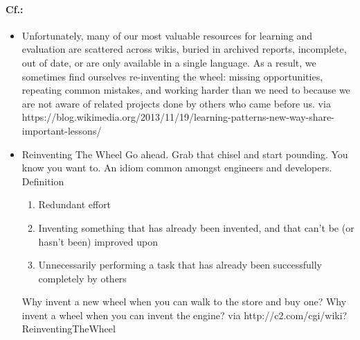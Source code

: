 \paragraph{Cf.:} 
\begin{itemize}
\item Unfortunately, many of our most valuable resources for learning and evaluation are scattered across wikis, buried in archived reports, incomplete, out of date, or are only available in a single language. As a result, we sometimes find ourselves re-inventing the wheel: missing opportunities, repeating common mistakes, and working harder than we need to because we are not aware of related projects done by others who came before us. via https://blog.wikimedia.org/2013/11/19/learning-patterns-new-way-share-important-lessons/
\item  Reinventing The Wheel Go ahead. Grab that chisel and start pounding. You know you want to.  An idiom common amongst engineers and developers.  Definition 
\begin{enumerate}
\item Redundant effort
\item Inventing something that has already been invented, and that can't be (or hasn't been) improved upon
\item Unnecessarily performing a task that has already been successfully completely by others
\end{enumerate}          
Why invent a new wheel when you can walk to the store and buy one? Why invent a wheel when you can invent the engine? via http://c2.com/cgi/wiki?ReinventingTheWheel
\end{itemize}